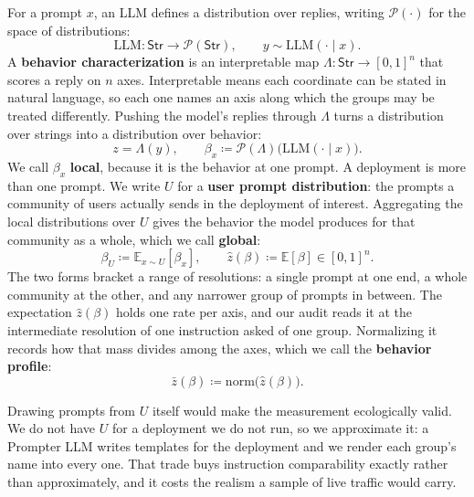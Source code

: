 For a prompt $x$, an LLM defines a distribution over replies, writing $\mathcal{P}(\cdot)$ for the space of distributions:
\begin{equation}
    \mathrm{LLM} : \mathsf{Str} \to \mathcal{P}(\mathsf{Str}),
    \qquad y \sim \mathrm{LLM}(\cdot \mid x).
    \label{eq:llm}
\end{equation}
A \textbf{behavior characterization} is an interpretable map $\Lambda : \mathsf{Str} \to [0,1]^{n}$ that scores a reply on $n$ axes.
Interpretable means each coordinate can be stated in natural language, so each one names an axis along which the groups may be treated differently.
Pushing the model's replies through $\Lambda$ turns a distribution over strings into a distribution over behavior:
\begin{equation}
    z = \Lambda(y),
    \qquad
    \beta_{x} \coloneqq \mathcal{P}(\Lambda)\bigl(\mathrm{LLM}(\cdot \mid x)\bigr).
    \label{eq:pushforward}
\end{equation}
We call $\beta_{x}$ \textbf{local}, because it is the behavior at one prompt.
A deployment is more than one prompt.
We write $U$ for a \textbf{user prompt distribution}: the prompts a community of users actually sends in the deployment of interest.
Aggregating the local distributions over $U$ gives the behavior the model produces for that community as a whole, which we call \textbf{global}:
\begin{equation}
    \beta_{U} \coloneqq \mathbb{E}_{x \sim U}\left[\beta_{x}\right],
    \qquad
    \hat{z}(\beta) \coloneqq \mathbb{E}\left[\beta\right] \in [0,1]^{n}.
    \label{eq:global}
\end{equation}
The two forms bracket a range of resolutions: a single prompt at one end, a whole community at the other, and any narrower group of prompts in between.
The expectation $\hat{z}(\beta)$ holds one rate per axis, and our audit reads it at the intermediate resolution of one instruction asked of one group.
Normalizing it records how that mass divides among the axes, which we call the \textbf{behavior profile}:
\begin{equation}
    \bar{z}(\beta) \coloneqq \mathrm{norm}\bigl(\hat{z}(\beta)\bigr).
    \label{eq:profile}
\end{equation}

Drawing prompts from $U$ itself would make the measurement ecologically valid.
We do not have $U$ for a deployment we do not run, so we approximate it: a Prompter LLM writes templates for the deployment and we render each group's name into every one.
That trade buys instruction comparability exactly rather than approximately, and it costs the realism a sample of live traffic would carry.

